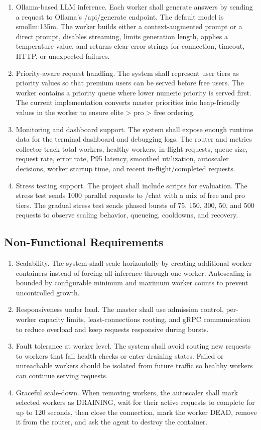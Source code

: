 \begin{enumerate}[label=FR-\arabic*., leftmargin=1.8em]
  \item Ollama-based LLM inference. Each worker shall generate answers by sending a request to Ollama's /api/generate endpoint. The default model is smollm:135m. The worker builds either a context-augmented prompt or a direct prompt, disables streaming, limits generation length, applies a temperature value, and returns clear error strings for connection, timeout, HTTP, or unexpected failures.
  \item Priority-aware request handling. The system shall represent user tiers as priority values so that premium users can be served before free users. The worker contains a priority queue where lower numeric priority is served first. The current implementation converts master priorities into heap-friendly values in the worker to ensure elite > pro > free ordering.
  \item Monitoring and dashboard support. The system shall expose enough runtime data for the terminal dashboard and debugging logs. The router and metrics collector track total workers, healthy workers, in-flight requests, queue size, request rate, error rate, P95 latency, smoothed utilization, autoscaler decisions, worker startup time, and recent in-flight/completed requests.
  \item Stress testing support. The project shall include scripts for evaluation. The stress test sends 1000 parallel requests to /chat with a mix of free and pro tiers. The gradual stress test sends phased bursts of 75, 150, 300, 50, and 500 requests to observe scaling behavior, queueing, cooldowns, and recovery.
\end{enumerate}

\subsection{Non-Functional Requirements}
\begin{enumerate}[label=NFR-\arabic*., leftmargin=1.8em]
  \item Scalability. The system shall scale horizontally by creating additional worker containers instead of forcing all inference through one worker. Autoscaling is bounded by configurable minimum and maximum worker counts to prevent uncontrolled growth.
  \item Responsiveness under load. The master shall use admission control, per-worker capacity limits, least-connections routing, and gRPC communication to reduce overload and keep requests responsive during bursts.
  \item Fault tolerance at worker level. The system shall avoid routing new requests to workers that fail health checks or enter draining states. Failed or unreachable workers should be isolated from future traffic so healthy workers can continue serving requests.
  \item Graceful scale-down. When removing workers, the autoscaler shall mark selected workers as DRAINING, wait for their active requests to complete for up to 120 seconds, then close the connection, mark the worker DEAD, remove it from the router, and ask the agent to destroy the container.
\end{enumerate}

